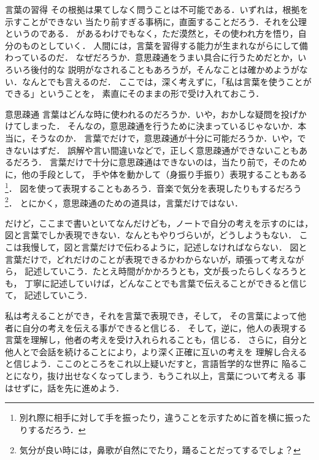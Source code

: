 \begin{memo}{言葉の習得}
{                        その根拠は果てしなく問うことは不可能である．いずれは，根拠を示すことができない
                        当たり前すぎる事柄に，直面することだろう．それを公理というのである．
                    }
                があるわけでもなく，ただ漠然と，その使われ方を悟り，自分のものとしていく．
                人間には，言葉を習得する能力が生まれながらにして備わっているのだ．
                なぜだろうか．意思疎通をうまい具合に行うためだとか，いろいろ後付的な
                説明がなされることもあろうが，そんなことは確かめようがない．なんとでも言えるのだ．
                ここでは，深く考えずに，「私は言葉を使うことができる」ということを，
                素直にそのままの形で受け入れておこう．
            \end{memo}

            \begin{memo}{意思疎通}
                言葉はどんな時に使われるのだろうか．いや，おかしな疑問を投げかけてしまった．
                そんなの，意思疎通を行うために決まっているじゃないか．本当に，そうなのか．
                言葉でだけで，意思疎通が十分に可能だろうか．いや，できないはずだ．
                誤解や言い間違いなどで，正しく意思疎通ができないこともあるだろう．
                言葉だけで十分に意思疎通はできないのは，当たり前で，そのために，他の手段として，
                手や体を動かして（身振り手振り）表現することもある
                    \footnote{
                        別れ際に相手に対して手を振ったり，違うことを示すために首を横に振ったりするだろう．
                    }．
                図を使って表現することもあろう．音楽で気分を表現したりもするだろう
                    \footnote{
                        気分が良い時には，鼻歌が自然にでたり，踊ることだってするでしょ？
                    }．
                とにかく，意思疎通のための道具は，言葉だけではない．

                だけど，ここまで書いといてなんだけども，ノートで自分の考えを示すのには，
                図と言葉でしか表現できない．なんともやりづらいが，どうしようもない．
                ここは我慢して，図と言葉だけで伝わるように，記述しなければならない．
                図と言葉だけで，どれだけのことが表現できるかわからないが，頑張って考えながら，
                記述していこう．たとえ時間がかかろうとも，文が長ったらしくなろうとも，
                丁寧に記述していけば，どんなことでも言葉で伝えることができると信じて，
                記述していこう．

                私は考えることができ，それを言葉で表現でき，そして，
                その言葉によって他者に自分の考えを伝える事ができると信じる．
                そして，逆に，他人の表現する言葉を理解し，他者の考えを受け入れられることも，信じる．
                さらに，自分と他人とで会話を続けることにより，より深く正確に互いの考えを
                理解し合えると信じよう．ここのところをこれ以上疑いだすと，言語哲学的な世界に
                陥ることになり，抜け出せなくなってしまう．もうこれ以上，言葉について考える
                事はせずに，話を先に進めよう．
            \end{memo}

